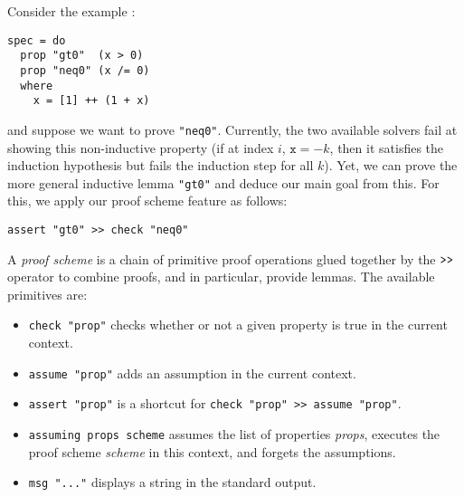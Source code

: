 Consider the example :
\begin{lstlisting}[frame=single]
spec = do
  prop "gt0"  (x > 0)
  prop "neq0" (x /= 0)
  where
    x = [1] ++ (1 + x)

\end{lstlisting}
and suppose we want to prove \texttt{"neq0"}. Currently, the two available
solvers fail at showing this non-inductive property (if at index $i$, $\texttt{x} =
-k$, then it satisfies the induction hypothesis but fails the induction step for
all $k$). Yet, we can prove the more general inductive lemma \texttt{"gt0"} and
deduce our main goal from this. For this, we apply our proof scheme feature as
follows:

\begin{lstlisting}[frame=single]
assert "gt0" >> check "neq0"
\end{lstlisting}

A \emph{proof scheme} is a chain of
primitive proof operations glued together by the $\texttt{\textgreater{}\textgreater{}}$
operator to combine proofs, and in particular, provide lemmas. The available primitives are:

\begin{itemize}
\itemsep1pt\parskip0pt
\item
  \texttt{check "prop"} checks whether or not a given property is true
  in the current context.
\item
  \texttt{assume "prop"} adds an assumption in the current context.
\item
  \texttt{assert "prop"} is a shortcut for
  \texttt{check "prop" \textgreater{}\textgreater{} assume "prop"}.
\item

\texttt{assuming props scheme} assumes the list of
  properties \emph{props}, executes the proof scheme \emph{scheme} in
  this context, and forgets the assumptions.

\item
  \texttt{msg "..."} displays a string in the standard output.
\end{itemize}

